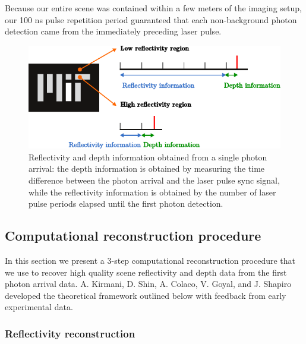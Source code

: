 Because our entire scene was contained within a few meters of the imaging setup, our 100 ns pulse repetition period guaranteed that each non-background photon detection came from the immediately preceding laser pulse.

\begin{figure}[htb]
\centerline{\includegraphics[width=14cm]{figure-first-pulses.pdf}}
\caption{Reflectivity and depth information obtained from a single photon arrival: the depth information is obtained by measuring the time difference between the photon arrival and the laser pulse sync signal, while the reflectivity information is obtained by the number of laser pulse periods elapsed until the first photon detection.}
\label{figure:first-pulses}
\end{figure}

\subsection{Computational reconstruction procedure}

In this section we present a 3-step computational reconstruction procedure that we use to recover high quality scene reflectivity and depth data from the first photon arrival data. A. Kirmani, D. Shin, A. Colaco, V. Goyal, and J. Shapiro developed the theoretical framework outlined below \cite{kirmani-first,kirmani-photon} with feedback from early experimental data.

\subsubsection{Reflectivity reconstruction}

